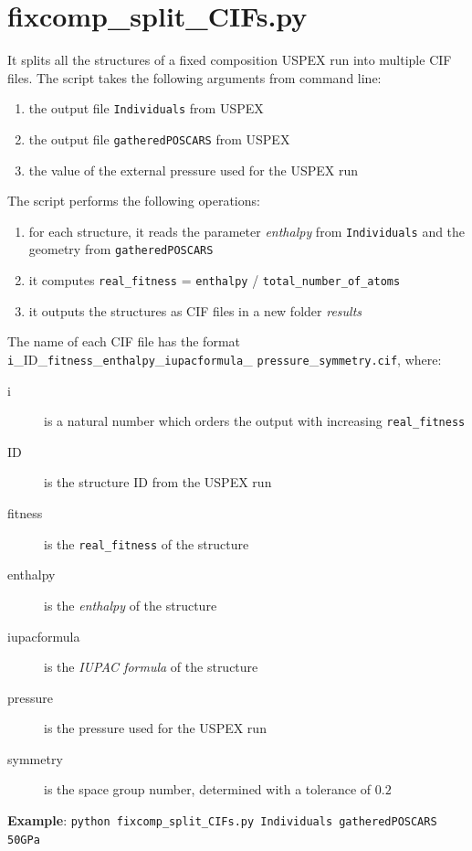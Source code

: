 \documentclass{article}
\begin{document}
\section{fixcomp\_split\_CIFs.py}
It splits all the structures of a fixed composition USPEX run into multiple CIF files. The script takes the following arguments from command line:
\begin{enumerate}
	\item the output file \texttt{Individuals} from USPEX
	\item the output file \texttt{gatheredPOSCARS} from USPEX
	\item the value of the external pressure used for the USPEX run
\end{enumerate}
The script performs the following operations:
\begin{enumerate}
	\item for each structure, it reads the parameter \emph{enthalpy} from \texttt{Individuals} and the geometry from \texttt{gatheredPOSCARS}
	\item it computes \texttt{real\_fitness} = \texttt{enthalpy} / \texttt{total\_number\_of\_atoms}
	\item it outputs the structures as CIF files in a new folder \textit{results}
\end{enumerate}
The name of each CIF file has the format \texttt{i}\_ID\_\texttt{fitness}\_\texttt{enthalpy}\_\texttt{iupacformula}\_ \texttt{pressure}\_\texttt{symmetry.cif}, where:
\begin{description}
	\item[i] is a natural number which orders the output with increasing \texttt{real\_fitness}
	\item[ID] is the structure ID from the USPEX run
	\item[fitness] is the \texttt{real\_fitness} of the structure
	\item[enthalpy] is the \emph{enthalpy} of the structure
	\item[iupacformula] is the \emph{IUPAC formula} of the structure
	\item[pressure] is the pressure used for the USPEX run
	\item[symmetry] is the space group number, determined with a tolerance of $0.2$
\end{description}
\textbf{Example}: \texttt{python fixcomp\_split\_CIFs.py Individuals gatheredPOSCARS 50GPa}
\end{document}
